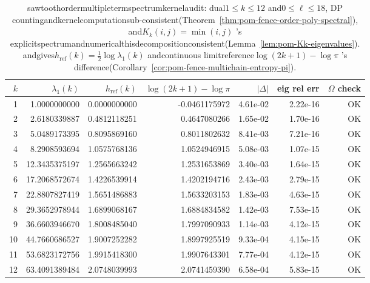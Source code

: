 \begin{table}[H]
\centering
\scriptsize
\setlength{\tabcolsep}{6pt}
\caption{sawtoothordermultipletermspectrumkernelaudit: dual$1\le k\le 12$ and$0\le \ell\le 18$, DP countingandkernelcomputationsub-consistent(Theorem~\ref{thm:pom-fence-order-poly-spectral}), and$K_k(i,j)=\min(i,j)$ 's explicitspectrumandnumericalthisdecompositionconsistent(Lemma~\ref{lem:pom-Kk-eigenvalues}). andgives$h_{\mathrm{ref}}(k)=\tfrac12\log\lambda_1(k)$ andcontinuous limitreference$\log(2k+1)-\log\pi$ 's difference(Corollary~\ref{cor:pom-fence-multichain-entropy-pi}). }
\label{tab:fence_order_poly_spectral_audit}
\begin{tabular}{r r r r r r r}
\toprule
$k$ & $\lambda_1(k)$ & $h_{\mathrm{ref}}(k)$ & $\log(2k+1)-\log\pi$ & $|\Delta|$ & eig rel err & $\Omega$ check\\
\midrule
1 & 1.0000000000 & 0.0000000000 & -0.0461175972 & 4.61e-02 & 2.22e-16 & OK\\
2 & 2.6180339887 & 0.4812118251 & 0.4647080266 & 1.65e-02 & 1.70e-16 & OK\\
3 & 5.0489173395 & 0.8095869160 & 0.8011802632 & 8.41e-03 & 7.21e-16 & OK\\
4 & 8.2908593694 & 1.0575768136 & 1.0524946915 & 5.08e-03 & 1.07e-15 & OK\\
5 & 12.3435375197 & 1.2565663242 & 1.2531653869 & 3.40e-03 & 1.64e-15 & OK\\
6 & 17.2068572674 & 1.4226539914 & 1.4202194716 & 2.43e-03 & 2.79e-15 & OK\\
7 & 22.8807827419 & 1.5651486883 & 1.5633203153 & 1.83e-03 & 4.63e-15 & OK\\
8 & 29.3652978944 & 1.6899068167 & 1.6884834582 & 1.42e-03 & 7.53e-15 & OK\\
9 & 36.6603946670 & 1.8008485040 & 1.7997090933 & 1.14e-03 & 4.12e-15 & OK\\
10 & 44.7660686527 & 1.9007252282 & 1.8997925519 & 9.33e-04 & 4.15e-15 & OK\\
11 & 53.6823172756 & 1.9915418300 & 1.9907643301 & 7.77e-04 & 4.12e-15 & OK\\
12 & 63.4091389484 & 2.0748039993 & 2.0741459390 & 6.58e-04 & 5.83e-15 & OK\\
\bottomrule
\end{tabular}
\end{table}
